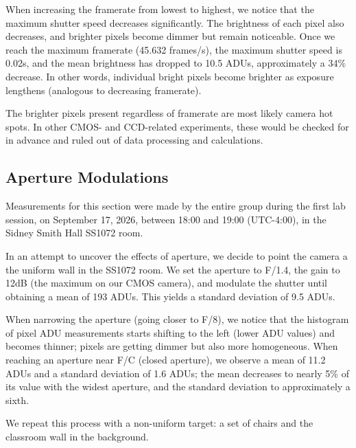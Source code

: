 \documentclass[preprint2]{aastex702}
\begin{document}
			When increasing the framerate from lowest to highest, we notice that the maximum shutter speed decreases significantly. The brightness of each pixel also decreases, and brighter pixels become dimmer but remain noticeable. Once we reach the maximum framerate (45.632 frames/s), the maximum shutter speed is 0.02s, and the mean brightness has dropped to 10.5 ADUs, approximately a 34\% decrease. In other words, individual bright pixels become brighter as exposure lengthens (analogous to decreasing framerate).

			The brighter pixels present regardless of framerate are most likely camera hot spots. In other CMOS- and CCD-related experiments, these would be checked for in advance and ruled out of data processing and calculations.

		\subsection{Aperture Modulations}\label{ssec:4.2.3}

			Measurements for this section were made by the entire group during the first lab session, on September 17, 2026, between 18:00 and 19:00 (UTC-4:00), in the Sidney Smith Hall SS1072 room.

			In an attempt to uncover the effects of aperture, we decide to point the camera a the uniform wall in the SS1072 room. We set the aperture to F/1.4, the gain to 12dB (the maximum on our CMOS camera), and modulate the shutter until obtaining a mean of 193 ADUs. This yields a standard deviation of 9.5 ADUs.

			When narrowing the aperture (going closer to F/8), we notice that the histogram of pixel ADU measurements starts shifting to the left (lower ADU values) and becomes thinner; pixels are getting dimmer but also more homogeneous. When reaching an aperture near F/C (closed aperture), we observe a mean of 11.2 ADUs and a standard deviation of 1.6 ADUs; the mean decreases to nearly 5\% of its value with the widest aperture, and the standard deviation to approximately a sixth.
				

			We repeat this process with a non-uniform target: a set of chairs and the classroom wall in the background. 
\end{document}
